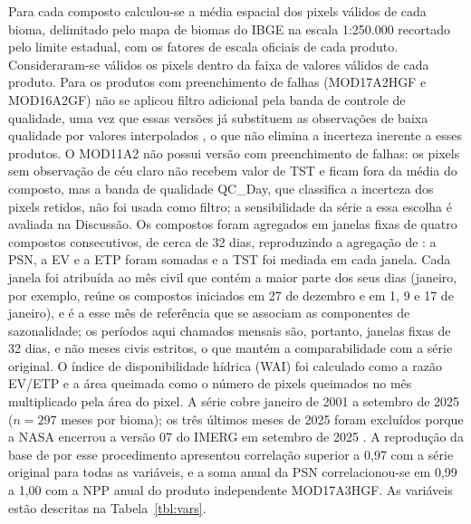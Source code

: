 \documentclass[a4paper,fleqn]{cas-sc}
\begin{document}
Para cada composto calculou-se a média espacial dos pixels válidos de cada bioma, delimitado pelo mapa de biomas do IBGE na escala 1:250.000 \citep{ibge2019} recortado pelo limite estadual, com os fatores de escala oficiais de cada produto. Consideraram-se válidos os pixels dentro da faixa de valores válidos de cada produto. Para os produtos com preenchimento de falhas (MOD17A2HGF e MOD16A2GF) não se aplicou filtro adicional pela banda de controle de qualidade, uma vez que essas versões já substituem as observações de baixa qualidade por valores interpolados \citep{running2021gpp}, o que não elimina a incerteza inerente a esses produtos. O MOD11A2 não possui versão com preenchimento de falhas: os pixels sem observação de céu claro não recebem valor de TST e ficam fora da média do composto, mas a banda de qualidade QC\_Day, que classifica a incerteza dos pixels retidos, não foi usada como filtro; a sensibilidade da série a essa escolha é avaliada na Discussão. Os compostos foram agregados em janelas fixas de quatro compostos consecutivos, de cerca de 32 dias, reproduzindo a agregação de \citet{benfica2022,benfica2023}: a PSN, a EV e a ETP foram somadas e a TST foi mediada em cada janela. Cada janela foi atribuída ao mês civil que contém a maior parte dos seus dias (janeiro, por exemplo, reúne os compostos iniciados em 27 de dezembro e em 1, 9 e 17 de janeiro), e é a esse mês de referência que se associam as componentes de sazonalidade; os períodos aqui chamados mensais são, portanto, janelas fixas de 32 dias, e não meses civis estritos, o que mantém a comparabilidade com a série original. O índice de disponibilidade hídrica (WAI) foi calculado como a razão EV/ETP e a área queimada como o número de pixels queimados no mês multiplicado pela área do pixel. A série cobre janeiro de 2001 a setembro de 2025 ($n = 297$ meses por bioma); os três últimos meses de 2025 foram excluídos porque a NASA encerrou a versão 07 do IMERG em setembro de 2025 \citep{nasa2026}. A reprodução da base de \citet{benfica2023} por esse procedimento apresentou correlação superior a 0,97 com a série original para todas as variáveis, e a soma anual da PSN correlacionou-se em 0,99 a 1,00 com a NPP anual do produto independente MOD17A3HGF. As variáveis estão descritas na Tabela~\ref{tbl:vars}.
\end{document}
